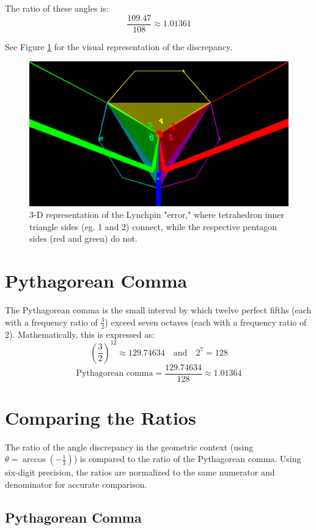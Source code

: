 \documentclass[a4paper,12pt]{article}
\begin{document}
\noindent
The ratio of these angles is:
\[
\frac{109.47}{108} \approx 1.01361
\]

\noindent
See Figure \ref{fig:3d-lynchpin-error} for the visual representation of the discrepancy.

\begin{figure}[h]
\centering
\includegraphics[width=\textwidth]{3d-lynchpin-error.png}
\caption{3-D representation of the Lynchpin "error," where tetrahedron inner triangle sides (eg. 1 and 2) connect, while the respective pentagon sides (red and green) do not.}
\label{fig:3d-lynchpin-error}
\end{figure}


\section{Pythagorean Comma}
The Pythagorean comma is the small interval by which twelve perfect fifths (each with a frequency ratio of \( \frac{3}{2} \)) exceed seven octaves (each with a frequency ratio of 2). Mathematically, this is expressed as:
\[
\left(\frac{3}{2}\right)^{12} \approx 129.74634 \quad \text{and} \quad 2^7 = 128
\]
\[
\text{Pythagorean comma} = \frac{129.74634}{128} \approx 1.01364
\]


\section{Comparing the Ratios}
The ratio of the angle discrepancy in the geometric context (using \(\theta = \arccos(-\frac{1}{3})\)) is compared to the ratio of the Pythagorean comma. Using six-digit precision, the ratios are normalized to the same numerator and denominator for accurate comparison.

\subsection{Pythagorean Comma}
\end{document}
